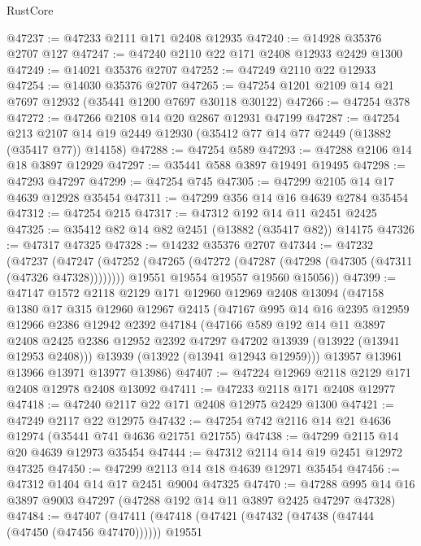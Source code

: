 \begin{lexlean}{RustCore}
\begin{coremodule}
@47237 := @47233 @2111 @171 @2408 @12935
@47240 := @14928 @35376 @2707 @127
@47247 := @47240 @2110 @22 @171 @2408 @12933 @2429 @1300
@47249 := @14021 @35376 @2707
@47252 := @47249 @2110 @22 @12933
@47254 := @14030 @35376 @2707
@47265 := @47254 @1201 @2109 @14 @21 @7697 @12932 (@35441 @1200 @7697 @30118 @30122)
@47266 := @47254 @378
@47272 := @47266 @2108 @14 @20 @2867 @12931 @47199
@47287 := @47254
    @213
    @2107
    @14
    @19
    @2449
    @12930
    (@35412 @77 @14 @77 @2449 (@13882 (@35417 @77)) @14158)
@47288 := @47254 @589
@47293 := @47288 @2106 @14 @18 @3897 @12929
@47297 := @35441 @588 @3897 @19491 @19495
@47298 := @47293 @47297
@47299 := @47254 @745
@47305 := @47299 @2105 @14 @17 @4639 @12928 @35454
@47311 := @47299 @356 @14 @16 @4639 @2784 @35454
@47312 := @47254 @215
@47317 := @47312 @192 @14 @11 @2451 @2425
@47325 := @35412 @82 @14 @82 @2451 (@13882 (@35417 @82)) @14175
@47326 := @47317 @47325
@47328 := @14232 @35376 @2707
@47344 := @47232
    (@47237
      (@47247
        (@47252 (@47265 (@47272 (@47287 (@47298 (@47305 (@47311 (@47326 @47328))))))))
        @19551
        @19554
        @19557
        @19560
        @15056))
@47399 := @47147
    @1572
    @2118
    @2129
    @171
    @12960
    @12969
    @2408
    @13094
    (@47158
      @1380
      @17
      @315
      @12960
      @12967
      @2415
      (@47167
        @995
        @14
        @16
        @2395
        @12959
        @12966
        @2386
        @12942
        @2392
        @47184
        (@47166
          @589
          @192
          @14
          @11
          @3897
          @2408
          @2425
          @2386
          @12952
          @2392
          @47297
          @47202
          @13939
          (@13922 (@13941 @12953 @2408)))
        @13939
        (@13922 (@13941 @12943 @12959)))
      @13957
      @13961
      @13966
      @13971
      @13977
      @13986)
@47407 := @47224 @12969 @2118 @2129 @171 @2408 @12978 @2408 @13092
@47411 := @47233 @2118 @171 @2408 @12977
@47418 := @47240 @2117 @22 @171 @2408 @12975 @2429 @1300
@47421 := @47249 @2117 @22 @12975
@47432 := @47254 @742 @2116 @14 @21 @4636 @12974 (@35441 @741 @4636 @21751 @21755)
@47438 := @47299 @2115 @14 @20 @4639 @12973 @35454
@47444 := @47312 @2114 @14 @19 @2451 @12972 @47325
@47450 := @47299 @2113 @14 @18 @4639 @12971 @35454
@47456 := @47312 @1404 @14 @17 @2451 @9004 @47325
@47470 := @47288 @995 @14 @16 @3897 @9003 @47297 (@47288 @192 @14 @11 @3897 @2425 @47297 @47328)
@47484 := @47407
    (@47411
      (@47418
        (@47421 (@47432 (@47438 (@47444 (@47450 (@47456 @47470))))))
        @19551

\end{coremodule}
\end{lexlean}
